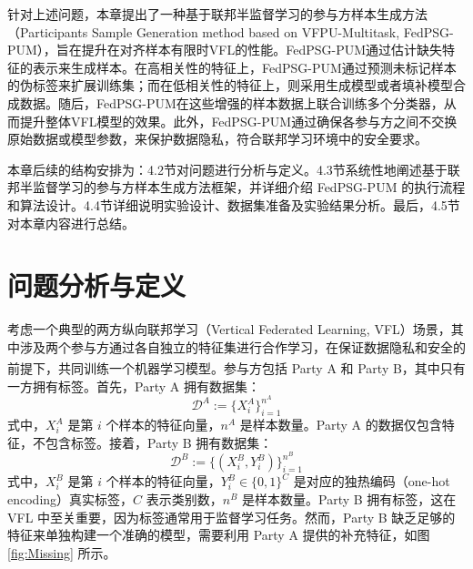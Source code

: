 针对上述问题，本章提出了一种基于联邦半监督学习的参与方样本生成方法（Participants Sample Generation method based on VFPU-Multitask, FedPSG-PUM），旨在提升在对齐样本有限时VFL的性能。FedPSG-PUM通过估计缺失特征的表示来生成样本。在高相关性的特征上，FedPSG-PUM通过预测未标记样本的伪标签来扩展训练集；而在低相关性的特征上，则采用生成模型或者填补模型合成数据。随后，FedPSG-PUM在这些增强的样本数据上联合训练多个分类器，从而提升整体VFL模型的效果。此外，FedPSG-PUM通过确保各参与方之间不交换原始数据或模型参数，来保护数据隐私，符合联邦学习环境中的安全要求。

本章后续的结构安排为：4.2节对问题进行分析与定义。4.3节系统性地阐述基于联邦半监督学习的参与方样本生成方法框架，并详细介绍  FedPSG-PUM  的执行流程和算法设计。4.4节详细说明实验设计、数据集准备及实验结果分析。最后，4.5节对本章内容进行总结。

\section{问题分析与定义}
考虑一个典型的两方纵向联邦学习（Vertical Federated Learning, VFL）场景，其中涉及两个参与方通过各自独立的特征集进行合作学习，在保证数据隐私和安全的前提下，共同训练一个机器学习模型\textsuperscript{\cite{yang2019federated}}。参与方包括 Party A 和 Party B，其中只有一方拥有标签。首先，Party A 拥有数据集：
\begin{equation}
	\mathcal{D}^A := \{X^A_i\}_{i=1}^{n^A}
\end{equation}
式中，$X^A_i$ 是第 $i$ 个样本的特征向量，$n^A$ 是样本数量。Party A 的数据仅包含特征，不包含标签。接着，Party B 拥有数据集：
\begin{equation}
	\mathcal{D}^B := \{(X^B_i, Y^B_i)\}_{i=1}^{n^B}
\end{equation}
式中，$X^B_i$ 是第 $i$ 个样本的特征向量，$Y^B_i \in \{0,1\}^C$ 是对应的独热编码（one-hot encoding）真实标签，$C$ 表示类别数，$n^B$ 是样本数量。Party B 拥有标签，这在 VFL 中至关重要，因为标签通常用于监督学习任务。然而，Party B 缺乏足够的特征来单独构建一个准确的模型，需要利用 Party A 提供的补充特征，如图 \ref{fig:Missing} 所示。

